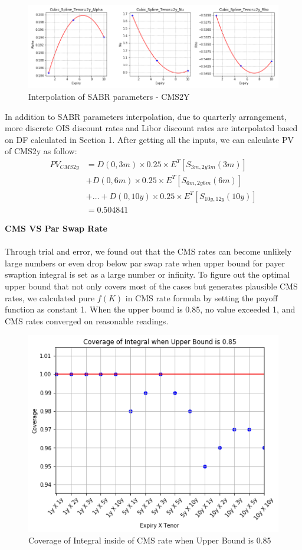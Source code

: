 \documentclass{article}
\begin{document}
\begin{figure}[h]
	\centering
	\includegraphics[scale=0.5]{Cubic_2y.png}
	\caption{Interpolation of SABR parameters - CMS2Y}
\end{figure}	

\noindent In addition to SABR parameters interpolation, due to quarterly arrangement, more discrete OIS discount rates and Libor discount rates are interpolated based on DF calculated in Section 1. After getting all the inputs, we can calculate PV of CMS2y as follow:
\begin{align*}
PV_{CMS2y}&=D(0,3m)\times 0.25 \times E^T [S_{3m,2y3m}(3m)] \\&+ D(0,6m) \times 0.25 \times E^T [S_{6m,2y6m}(6m)]\\&+ \dots 
+D(0,10y) \times 0.25 \times E^T [S_{10y,12y}(10y)]\\&= 0.504841
\end{align*}

\newpage

\noindent \textbf{CMS VS Par Swap Rate}\\ \\
Through trial and error, we found out that the CMS rates can become unlikely large numbers or even drop below par swap rate when upper bound for payer swaption integral is set as a large number or infinity. To figure out the optimal upper bound that not only covers most of the cases but generates plausible CMS rates, we calculated pure $f(K)$ in CMS rate formula by setting the payoff function as constant 1. When the upper bound is 0.85, no value exceeded 1, and CMS rates converged on reasonable readings.

\begin{figure}[h]
	\centering
	\includegraphics[scale=0.48]{Coverage.png}
	\caption{Coverage of Integral inside of CMS rate when Upper Bound is 0.85}
\end{figure}
\end{document}

